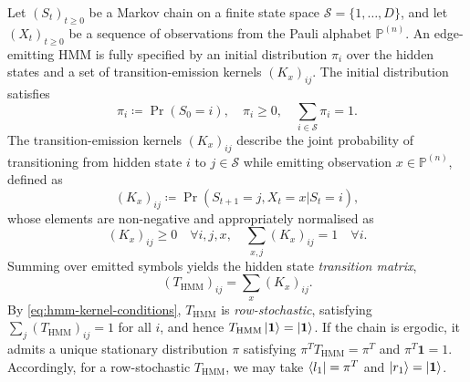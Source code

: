 Let \((S_t)_{t\geq 0}\) be a Markov chain on a finite state space \(\mathcal{S}=\{1,\dots,D\}\), and let \((X_t)_{t\geq 0}\) be a sequence of observations from the Pauli alphabet \(\mathbb{P}^{(n)}\). An edge-emitting HMM is fully specified by an initial distribution \(\pi_i\) over the hidden states and a set of transition-emission kernels \((K_x)_{ij}\). The initial distribution satisfies
\begin{equation}
    \pi_i \coloneq \Pr(S_0=i), 
    \quad 
    \pi_i \ge 0,\quad \sum_{i\in\mathcal S}\pi_i = 1.
\end{equation}
The transition-emission kernels \((K_x)_{ij}\) describe the joint probability of transitioning from hidden state \(i\) to \(j \in \mathcal{S}\) while emitting observation \(x \in \mathbb{P}^{(n)}\), defined as
\begin{equation}
    (K_x)_{ij} \coloneq \Pr{(S_{t+1}=j, X_t = x | S_t = i)},
\end{equation}
whose elements are non-negative and appropriately normalised as
\begin{equation}\label{eq:hmm-kernel-conditions}
    (K_x)_{ij} \geq 0 \quad \forall i,j,x,
    \quad
    \sum_{x,j} (K_x)_{ij} = 1 \quad \forall i.
\end{equation}
Summing over emitted symbols yields the hidden state \emph{transition matrix},
\begin{equation}
    (T_{\mathrm{HMM}})_{ij} = \sum_{x} (K_x)_{ij}.
\end{equation}
By \cref{eq:hmm-kernel-conditions}, \(T_{\mathrm{HMM}}\) is \emph{row-stochastic}, satisfying \(\sum_j (T_{\mathrm{HMM}})_{ij} = 1\) for all \(i\), and hence \(T_{\mathrm{HMM}}\ket{\mathbf{1}} = \ket{\mathbf{1}}\). If the chain is ergodic, it admits a unique stationary distribution \(\pi\) satisfying \(\pi^T T_{\mathrm{HMM}} = \pi^T\) and \(\pi^T\mathbf{1} = 1\). Accordingly, for a row-stochastic \(T_{\mathrm{HMM}}\), we may take \(\bra{l_1} = \pi^T\) and \(\ket{r_1} = \ket{\mathbf{1}}\).

